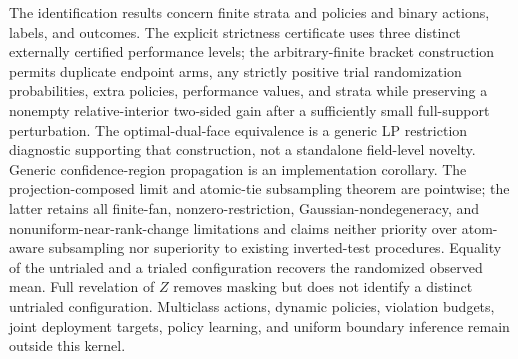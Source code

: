 \documentclass{article}
\begin{document}
The identification results concern finite strata and policies and binary actions, labels, and outcomes. The explicit strictness certificate uses three distinct externally certified performance levels; the arbitrary-finite bracket construction permits duplicate endpoint arms, any strictly positive trial randomization probabilities, extra policies, performance values, and strata while preserving a nonempty relative-interior two-sided gain after a sufficiently small full-support perturbation. The optimal-dual-face equivalence is a generic LP restriction diagnostic supporting that construction, not a standalone field-level novelty. Generic confidence-region propagation is an implementation corollary. The projection-composed limit and atomic-tie subsampling theorem are pointwise; the latter retains all finite-fan, nonzero-restriction, Gaussian-nondegeneracy, and nonuniform-near-rank-change limitations and claims neither priority over atom-aware subsampling nor superiority to existing inverted-test procedures. Equality of the untrialed and a trialed configuration recovers the randomized observed mean. Full revelation of \(Z\) removes masking but does not identify a distinct untrialed configuration. Multiclass actions, dynamic policies, violation budgets, joint deployment targets, policy learning, and uniform boundary inference remain outside this kernel.
\end{document}
